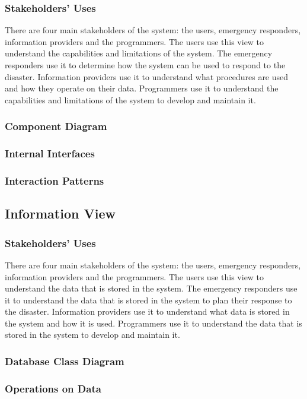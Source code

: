 \documentclass[a4paper]{article}
\begin{document}
    \subsubsection{Stakeholders' Uses}
    There are four main stakeholders of the system: the users, emergency responders, information providers and the programmers.
    The users use this view to understand the capabilities and limitations of the system. The emergency responders use it to
    determine how the system can be used to respond to the disaster. Information providers use it to understand what procedures
    are used and how they operate on their data. Programmers use it to understand the capabilities and limitations of the system
    to develop and maintain it.
    \subsubsection{Component Diagram}
    \subsubsection{Internal Interfaces}
    \lipsum[1-1] %
    \subsubsection{Interaction Patterns}
    \lipsum[1-1] %
    \subsection{Information View}
    \subsubsection{Stakeholders' Uses}
    There are four main stakeholders of the system: the users, emergency responders, information providers and the programmers.
    The users use this view to understand the data that is stored in the system. The emergency responders use it to understand
    the data that is stored in the system to plan their response to the disaster. Information providers use it to understand
    what data is stored in the system and how it is used. Programmers use it to understand the data that is stored in the system
    to develop and maintain it.
    \subsubsection{Database Class Diagram}
    \subsubsection{Operations on Data}
    \lipsum[1-1] %
\end{document}
